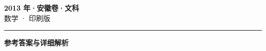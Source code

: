 \documentclass[zihao=5, a4paper]{ctexart}
\begin{document}
\begin{center}
  {\Large\bfseries 2013 年·安徽卷·文科}\\[4pt]
  {\large 数学 · 印刷版}
\end{center}
\medskip
{}

\par\bigskip\hrule\bigskip
{}
\Needspace{0.55\textheight}
\begin{center}{\large\bfseries 参考答案与详细解析}\end{center}
\smallskip

\end{document}
